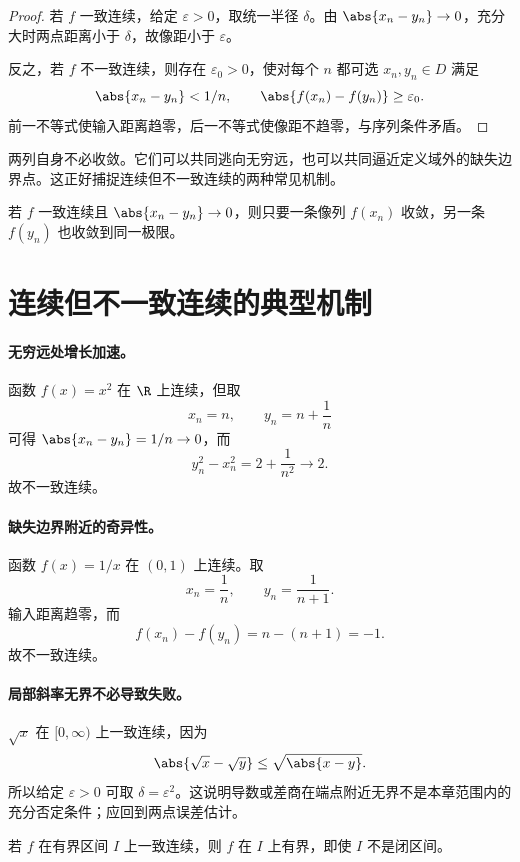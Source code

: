 \begin{proof}
若 \(f\) 一致连续，给定 \(\varepsilon>0\)，取统一半径 \(\delta\)。由 \(\abs{x_n-y_n}\to0\)，充分大时两点距离小于 \(\delta\)，故像距小于 \(\varepsilon\)。

反之，若 \(f\) 不一致连续，则存在 \(\varepsilon_0>0\)，使对每个 \(n\) 都可选 \(x_n,y_n\in D\) 满足
\[
 \abs{x_n-y_n}<1/n,\qquad
 \abs{f(x_n)-f(y_n)}\ge\varepsilon_0.
\]
前一不等式使输入距离趋零，后一不等式使像距不趋零，与序列条件矛盾。
\end{proof}

两列自身不必收敛。它们可以共同逃向无穷远，也可以共同逼近定义域外的缺失边界点。这正好捕捉连续但不一致连续的两种常见机制。

\begin{corollary}
若 \(f\) 一致连续且 \(\abs{x_n-y_n}\to0\)，则只要一条像列 \(f(x_n)\) 收敛，另一条 \(f(y_n)\) 也收敛到同一极限。
\end{corollary}

\section{连续但不一致连续的典型机制}

\paragraph{无穷远处增长加速。}
函数 \(f(x)=x^2\) 在 \(\R\) 上连续，但取
\[
 x_n=n,\qquad y_n=n+\frac1n
\]
可得 \(\abs{x_n-y_n}=1/n\to0\)，而
\[
 y_n^2-x_n^2=2+\frac1{n^2}\to2.
\]
故不一致连续。

\paragraph{缺失边界附近的奇异性。}
函数 \(f(x)=1/x\) 在 \((0,1)\) 上连续。取
\[
 x_n=\frac1n,\qquad y_n=\frac1{n+1}.
\]
输入距离趋零，而
\[
 f(x_n)-f(y_n)=n-(n+1)=-1.
\]
故不一致连续。

\paragraph{局部斜率无界不必导致失败。}
\(\sqrt x\) 在 \([0,\infty)\) 上一致连续，因为
\[
 \abs{\sqrt x-\sqrt y}\le\sqrt{\abs{x-y}}.
\]
所以给定 \(\varepsilon>0\) 可取 \(\delta=\varepsilon^2\)。这说明导数或差商在端点附近无界不是本章范围内的充分否定条件；应回到两点误差估计。

\begin{proposition}
若 \(f\) 在有界区间 \(I\) 上一致连续，则 \(f\) 在 \(I\) 上有界，即使 \(I\) 不是闭区间。
\end{proposition}

